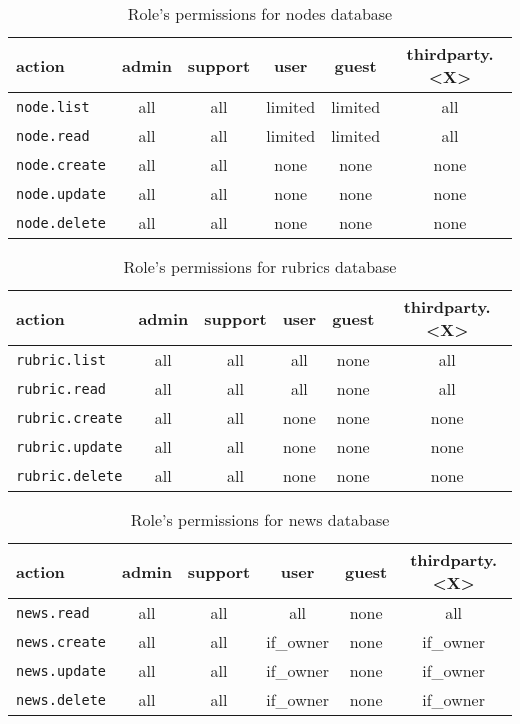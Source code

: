 \begin{table}[htbp]
\label{tab:protocoldef:permissionmatrix:nodesdb}
  \begin{tabular}{|l|c|c|c|c|c|} \hline
    action             & admin & support & user    & guest   & thirdparty.<X> \\ \hline \hline
    \verb|node.list|   & all   & all     & limited & limited & all  \\ \hline
    \verb|node.read|   & all   & all     & limited & limited & all  \\ \hline
    \verb|node.create| & all   & all     & none    & none    & none \\ \hline
    \verb|node.update| & all   & all     & none    & none    & none \\ \hline
    \verb|node.delete| & all   & all     & none    & none    & none \\ \hline
  \end{tabular}
  \caption{Role's permissions for nodes database}
\end{table}

\begin{table}[htbp]
\label{tab:protocoldef:permissionmatrix:rubricdb}
  \begin{tabular}{|l|c|c|c|c|c|} \hline
    action               & admin & support & user & guest & thirdparty.<X> \\ \hline \hline
    \verb|rubric.list|   & all   & all     & all  & none  & all  \\ \hline
    \verb|rubric.read|   & all   & all     & all  & none  & all  \\ \hline
    \verb|rubric.create| & all   & all     & none & none  & none \\ \hline
    \verb|rubric.update| & all   & all     & none & none  & none \\ \hline
    \verb|rubric.delete| & all   & all     & none & none  & none \\ \hline
  \end{tabular}
  \caption{Role's permissions for rubrics database}
\end{table}

\begin{table}[htbp]
\label{tab:protocoldef:permissionmatrix:newsdb}
  \begin{tabular}{|l|c|c|c|c|c|} \hline
    action             & admin & support & user      & guest & thirdparty.<X> \\ \hline \hline
    \verb|news.read|   & all   & all     & all       & none  & all       \\ \hline
    \verb|news.create| & all   & all     & if\_owner & none  & if\_owner \\ \hline
    \verb|news.update| & all   & all     & if\_owner & none  & if\_owner \\ \hline
    \verb|news.delete| & all   & all     & if\_owner & none  & if\_owner \\ \hline
  \end{tabular}
  \caption{Role's permissions for news database}
\end{table}


